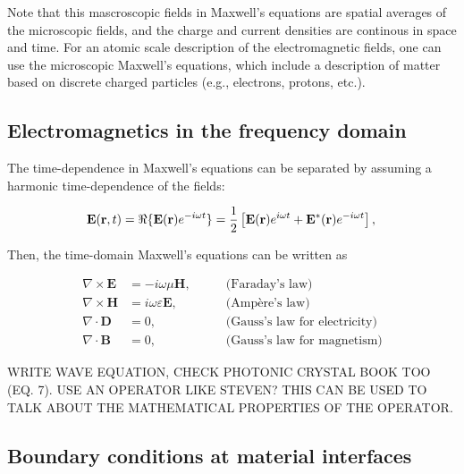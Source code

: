 Note that this mascroscopic fields in Maxwell's equations are spatial averages of the
microscopic fields, and the charge and current densities are continous in space and time.
For an atomic scale description of the electromagnetic fields, one can use the microscopic
Maxwell's equations, which include a description of matter based on discrete charged particles
(e.g., electrons, protons, etc.).

\subsection*{Electromagnetics in the frequency domain}

The time-dependence in Maxwell's equations can be separated by assuming a harmonic time-dependence of the fields:

\begin{equation}
    \mathbf{E}(\mathbf{r}, t) = \Re \{ \mathbf{E}(\mathbf{r}) e^{-i\omega t} \} = \frac{1}{2}\left[ \mathbf{E}(\mathbf{r}) e^{i\omega t} + \mathbf{E}^*(\mathbf{r}) e^{-i\omega t}\right], \label{eq:E_harmonic}\\
\end{equation}

Then, the time-domain Maxwell's equations can be written as

\begin{align}
    \nabla \times \mathbf{E} &= -i\omega \mu \mathbf{H}, \quad \quad &\text{(Faraday's law)} \label{eq:curlE_freq}\\
    \nabla \times \mathbf{H} &= i\omega \varepsilon \mathbf{E}, \quad \quad &\text{(Ampère's law)} \label{eq:curlH_freq}\\
    \nabla \cdot \mathbf{D} &= 0, \quad \quad &\text{(Gauss's law for electricity)} \label{eq:divD_freq}\\
    \nabla \cdot \mathbf{B} &= 0, \quad \quad &\text{(Gauss's law for magnetism)} \label{eq:divB_freq}
\end{align}

WRITE WAVE EQUATION, CHECK PHOTONIC CRYSTAL BOOK TOO (EQ. 7). USE AN OPERATOR LIKE STEVEN? 
THIS CAN BE USED TO TALK ABOUT THE MATHEMATICAL PROPERTIES OF THE OPERATOR.

\subsection*{Boundary conditions at material interfaces}

